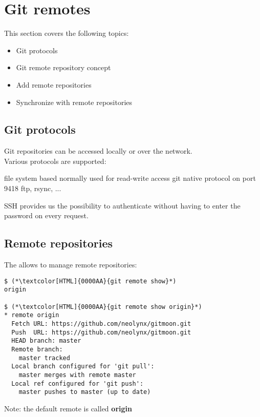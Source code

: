\section{Git remotes}
\begin{frame}[fragile]
  \slidetitle
  This section covers the following topics:
  \begin{itemize}
    \item Git protocols
    \item Git remote repository concept
    \item Add remote repositories
    \item Synchronize with remote repositories
  \end{itemize}
\end{frame}

\subsection{Git protocols}
\begin{frame}[fragile]
  \subslidetitle
  Git repositories can be accessed locally or over the network.
  \\
  \vspace{1em}
  Various protocols are supported:
  \begin{itemize}
    {file system based}
      {normally used for read-write access}
      {git native protocol on port 9418}
   {ftp, rsync, ...}
  \end{itemize}
  \vspace{1em}
  SSH provides us the possibility to authenticate without having to enter the password on every request.
\end{frame}

\subsection{Remote repositories}
\begin{frame}[fragile]
  \subslidetitle
  The  allows to manage remote repositories:
  \begin{lstlisting}
$ (*\textcolor[HTML]{0000AA}{git remote show}*)
origin

$ (*\textcolor[HTML]{0000AA}{git remote show origin}*)
* remote origin
  Fetch URL: https://github.com/neolynx/gitmoon.git
  Push  URL: https://github.com/neolynx/gitmoon.git
  HEAD branch: master
  Remote branch:
    master tracked
  Local branch configured for 'git pull':
    master merges with remote master
  Local ref configured for 'git push':
    master pushes to master (up to date)
\end{lstlisting}
  \vspace{1em}
  Note: the default remote is called \textbf{origin}
\end{frame}

